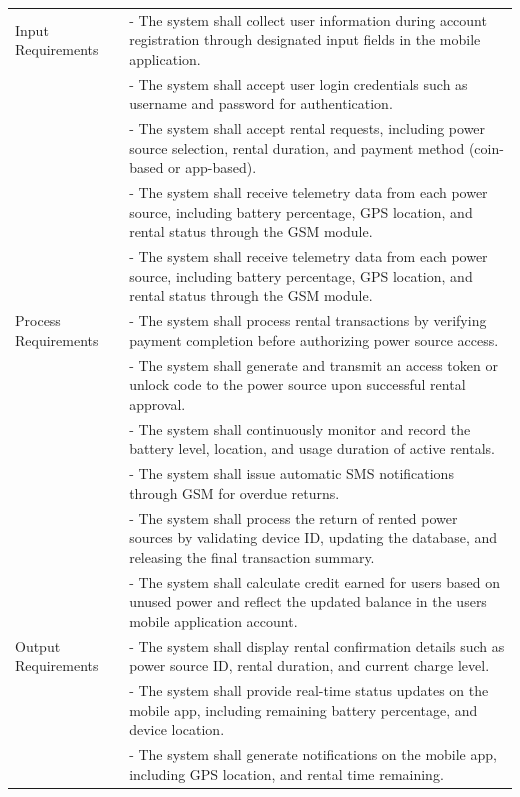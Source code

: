 {\begin{longtable}{p{4cm} p{9cm}}
	\bottomrule
	\endfoot
	
	Input Requirements & - The system shall collect user information during account registration through designated input fields in the mobile application. \\
	& - The system shall accept user login credentials such as username and password for authentication. \\
	& - The system shall accept rental requests, including power source selection, rental duration, and payment method (coin-based or app-based).\\
	& - The system shall receive telemetry data from each power source, including battery percentage, GPS location, and rental status through the GSM module. \\
	& - The system shall receive telemetry data from each power source, including battery percentage, GPS location, and rental status through the GSM module.  \\
	\midrule
	
	Process Requirements & - The system shall process rental transactions by verifying payment completion before authorizing power source access. \\
	& - The system shall generate and transmit an access token or unlock code to the power source upon successful rental approval. \\
	& - The system shall continuously monitor and record the battery level, location, and usage duration of active rentals. \\
	& - The system shall issue automatic SMS notifications through GSM for overdue returns. \\
	& - The system shall process the return of rented power sources by validating device ID, updating the database, and releasing the final transaction summary. \\
	& - The system shall calculate credit earned for users based on unused power and reflect the updated balance in the users mobile application account. \\
	\midrule
	
	Output Requirements & - The system shall display rental confirmation details such as power source ID, rental duration, and current charge level. \\
	& - The system shall provide real-time status updates on the mobile app, including remaining battery percentage, and device location. \\
	& - The system shall generate notifications on the mobile app, including GPS location, and rental time remaining. \\
	\midrule
	

\end{longtable}}
